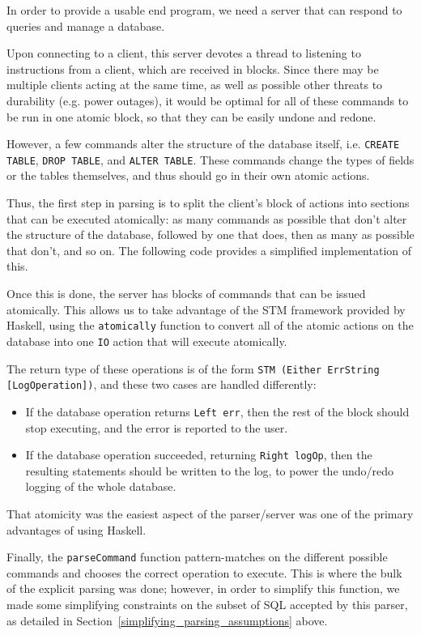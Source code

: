 
In order to provide a usable end program, we need a server that can respond to queries and manage a database.

Upon connecting to a client, this server devotes a thread to listening to instructions from a client, which are received in blocks. Since there may be multiple clients acting at the same time, as well as possible other threats to durability (e.g. power outages), it would be optimal for all of these commands to be run in one atomic block, so that they can be easily undone and redone.

However, a few commands alter the structure of the database itself, i.e. \verb+CREATE TABLE+, \verb+DROP TABLE+, and \verb+ALTER TABLE+. These commands change the types of fields or the tables themselves, and thus should go in their own atomic actions.

Thus, the first step in parsing is to split the client's block of actions into sections that can be executed atomically: as many commands as possible that don't alter the structure of the database, followed by one that does, then as many as possible that don't, and so on. The following code provides a simplified implementation of this.

Once this is done, the server has blocks of commands that can be issued atomically. This allows us to take advantage of the STM framework provided by Haskell, using the \verb+atomically+ function to convert all of the atomic actions on the database into one \verb+IO+ action that will execute atomically.

The return type of these operations is of the form \verb+STM (Either ErrString [LogOperation])+, and these two cases are handled differently:
\begin{itemize}
	\item If the database operation returns \verb+Left err+, then the rest of the block should stop executing, and the error is reported to the user.
	\item If the database operation succeeded, returning \verb+Right logOp+, then the resulting statements should be written to the log, to power the undo/redo logging of the whole database.
\end{itemize}
That atomicity was the easiest aspect of the parser/server was one of the primary advantages of using Haskell.

Finally, the \verb+parseCommand+ function pattern-matches on the different possible commands and chooses the correct operation to execute. This is where the bulk of the explicit parsing was done; however, in order to simplify this function, we made some simplifying constraints on the subset of SQL accepted by this parser, as detailed in Section~\ref{simplifying_parsing_assumptions} above.

